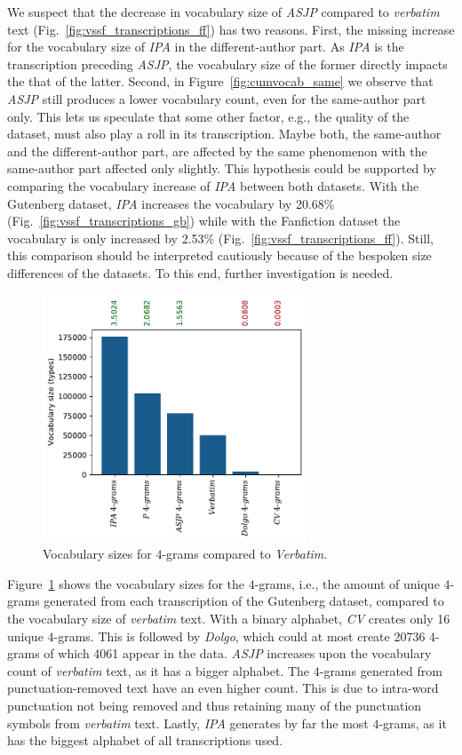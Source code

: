 We suspect that the decrease in vocabulary size of \textit{ASJP} compared to \textit{verbatim} text (Fig.~\ref{fig:vssf_transcriptions_ff}) has two reasons.
First, the missing increase for the vocabulary size of \textit{IPA} in the different-author part.
As \textit{IPA} is the transcription preceding \textit{ASJP}, the vocabulary size of the former directly impacts the that of the latter.
Second, in Figure~\ref{fig:cumvocab_same} we observe that \textit{ASJP} still produces a lower vocabulary count, even for the same-author part only.
This lets us speculate that some other factor, e.g., the quality of the dataset, must also play a roll in its transcription.
Maybe both, the same-author and the different-author part, are affected by the same phenomenon with the same-author part affected only slightly.
This hypothesis could be supported by comparing the vocabulary increase of \textit{IPA} between both datasets.
With the Gutenberg dataset, \textit{IPA} increases the vocabulary by 20.68\% (Fig.~\ref{fig:vssf_transcriptions_gb}) while with the Fanfiction dataset the vocabulary is only increased by 2.53\% (Fig.~\ref{fig:vssf_transcriptions_ff}).
Still, this comparison should be interpreted cautiously because of the bespoken size differences of the datasets.
To this end, further investigation is needed.\newline

\begin{figure}
  \centering
  \includegraphics[width=0.7\textwidth]{figures/vocab_sizes_2021-07-28_14-42-08_gb_ngram}
  \caption{Vocabulary sizes for $4$-grams compared to \textit{Verbatim}.}
  \label{fig:vssf_ngrams_gb}
\end{figure}
Figure~\ref{fig:vssf_ngrams_gb} shows the vocabulary sizes for the $4$-grams, i.e., the amount of unique $4$-grams generated from each transcription of the Gutenberg dataset, compared to the vocabulary size of \textit{verbatim} text.
With a binary alphabet, \textit{CV} creates only 16 unique $4$-grams.
This is followed by \textit{Dolgo}, which could at most create 20736 $4$-grams of which 4061 appear in the data.
\textit{ASJP} increases upon the vocabulary count of \textit{verbatim} text, as it has a bigger alphabet.
The $4$-grams generated from punctuation-removed text have an even higher count.
This is due to intra-word punctuation not being removed and thus retaining many of the punctuation symbols from \textit{verbatim} text.
Lastly, \textit{IPA} generates by far the most $4$-grams, as it has the biggest alphabet of all transcriptions used.